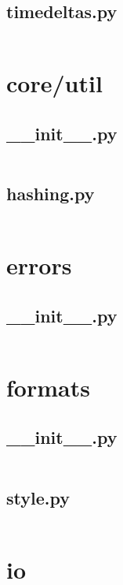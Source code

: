 \documentclass{article}
\begin{document}
\subsection{timedeltas.py}
\inputminted{python}{/home/dufferzafar/dev/@clones/pandas/pandas/core/tools/timedeltas.py}
\newpage

\section{core/util}

\subsection{\_\_init\_\_.py}
\inputminted{python}{/home/dufferzafar/dev/@clones/pandas/pandas/core/util/__init__.py}
\newpage

\subsection{hashing.py}
\inputminted{python}{/home/dufferzafar/dev/@clones/pandas/pandas/core/util/hashing.py}
\newpage

\section{errors}

\subsection{\_\_init\_\_.py}
\inputminted{python}{/home/dufferzafar/dev/@clones/pandas/pandas/errors/__init__.py}
\newpage

\section{formats}

\subsection{\_\_init\_\_.py}
\inputminted{python}{/home/dufferzafar/dev/@clones/pandas/pandas/formats/__init__.py}
\newpage

\subsection{style.py}
\inputminted{python}{/home/dufferzafar/dev/@clones/pandas/pandas/formats/style.py}
\newpage

\section{io}
\end{document}
